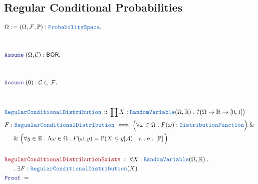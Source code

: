 \documentclass[12pt]{scrartcl}
\newcommand{\TYPE}[1]{\textcolor{NavyBlue}{\mathtt{#1}}}
\newcommand{\LOGIC}[1]{\textcolor{Blue}{\mathtt{#1}}}
\newcommand{\THM}[1]{\textcolor{Maroon}{\mathtt{#1}}}
\renewcommand{\.}{\; . \;}
\newcommand{\de}{: \kern 0.1pc =}
\newcommand{\Theorem}[2]{& \THM{#1} \, :: \, #2 \\ & \Proof = \\ }
\newcommand{\DeclareType}[2]{& \TYPE{#1} \, :: \, #2 \\}
\newcommand{\DefineType}[3]{& #1 : \TYPE{#2} \iff #3 \\}
\newcommand{\NewLine}{\\ & \kern 1pc}
\newcommand{\Page}[1]{\begin{align*} #1 \end{align*}   }
\renewcommand{\And}{\; \& \;}
\newcommand{\Reals}{\mathbb{R} }
\newcommand{\Say}[3]{& #1 \de #2 : #3, \\}
\newcommand{\A}{\LOGIC{Assume} \;}
\newcommand{\Assume}[2]{& \A #1 : #2, \\}
\newcommand{\Proof}{\LOGIC{Proof} \; }
\newcommand{\DF}{\TYPE{DistributionFunction}}
\renewcommand{\AE}[1]{\quad \mathrm{a\. e\.} \left[#1\right] }
\newcommand{\BOR}{\mathsf{BOR}}
\newcommand{\F}{\mathcal{F}}
\renewcommand{\O}{\Omega}
\renewcommand{\P}{\mathbb{P}}
\newcommand{\RV}{\TYPE{RandomVariable}}
\begin{document}
\subsection{Regular Conditional Probabilities}
\Page{
	\Say{\O}{(\O,\F,\P)}{\TYPE{ProbabilitySpace}}\\
	\\
	\Assume{(\O,\mathcal{C})}{\BOR} \\
	\\
	\Assume{(0)}{\mathcal{C} \subset \F} \\
	\\
	\DeclareType{RegularConditionalDistribution}{\prod X : \RV(\O,\Reals) \. ?\big(\O \to \Reals \to [0,1]\big)}
	\DefineType{F}{RegualarConditionalDistribution}{\Big( \forall \omega \in \O \.  F(\omega) : \DF  \Big) \And 
	\NewLine \And
	\Big( \forall y \in \Reals \. \Lambda \omega \in \O \. F(\omega,y) = \P(X \le y| \mathcal{A}) \AE{\P}  \Big)}
	\\
	\Theorem{RegularConditionalDistributionExists}{\forall X : \RV(\O,\Reals) \. 
		\NewLine \.	\exists F : \TYPE{RegularConditionalDistribution}(X) }
}
\end{document}
